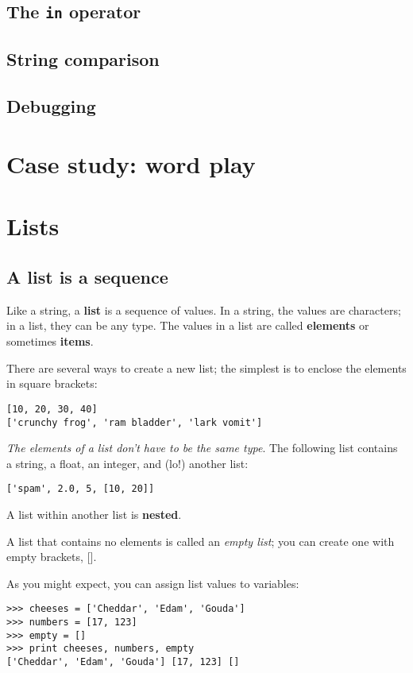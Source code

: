 \documentclass{article}
\begin{document}
\subsection{The \texttt{in} operator}
\subsection{String comparison}
\subsection{Debugging}

\newpage%
\section{Case study: word play}
\section{Lists}
\subsection{A list is a sequence}
Like a string, a \textbf{list} is a sequence of values.
In a string, the values
are characters; in a list, they can be any type. The values in a list
are called \textbf{elements} or sometimes \textbf{items}.
\par There are several ways to create a new list; the simplest is to
enclose the elements in square brackets:
\begin{verbatim}
[10, 20, 30, 40]
['crunchy frog', 'ram bladder', 'lark vomit']
\end{verbatim}
\par \emph{The elements of a list don't have to be the same
type}. The following list contains a string, a float, an integer, and
(lo!) another list:
\begin{verbatim}
['spam', 2.0, 5, [10, 20]]
\end{verbatim}
\par A list within another list is \textbf{nested}.
\par A list that contains no elements is called an \emph{empty list};
you can create one with empty brackets, [].
\par As you might expect, you can assign list values to variables:
\begin{verbatim}
>>> cheeses = ['Cheddar', 'Edam', 'Gouda']
>>> numbers = [17, 123]
>>> empty = []
>>> print cheeses, numbers, empty
['Cheddar', 'Edam', 'Gouda'] [17, 123] []
\end{verbatim}
\end{document}
